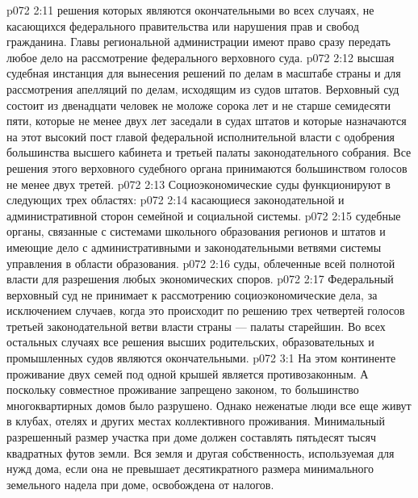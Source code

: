 \vs p072 2:11 \bibnobreakspace {} решения которых являются окончательными во всех случаях, не касающихся федерального правительства или нарушения прав и свобод гражданина. Главы региональной администрации имеют право сразу передать любое дело на рассмотрение федерального верховного суда.
\vs p072 2:12 \bibnobreakspace {} высшая судебная инстанция для вынесения решений по делам в масштабе страны и для рассмотрения апелляций по делам, исходящим из судов штатов. Верховный суд состоит из двенадцати человек не моложе сорока лет и не старше семидесяти пяти, которые не менее двух лет заседали в судах штатов и которые назначаются на этот высокий пост главой федеральной исполнительной власти с одобрения большинства высшего кабинета и третьей палаты законодательного собрания. Все решения этого верховного судебного органа принимаются большинством голосов не менее двух третей.
\vs p072 2:13 \pc Социоэкономические суды функционируют в следующих трех областях:
\vs p072 2:14 \bibnobreakspace {} касающиеся законодательной и административной сторон семейной и социальной системы.
\vs p072 2:15 \bibnobreakspace {} судебные органы, связанные с системами школьного образования регионов и штатов и имеющие дело с административными и законодательными ветвями системы управления в области образования.
\vs p072 2:16 \bibnobreakspace {} суды, облеченные всей полнотой власти для разрешения любых экономических споров.
\vs p072 2:17 \pc Федеральный верховный суд не принимает к рассмотрению социоэкономические дела, за исключением случаев, когда это происходит по решению трех четвертей голосов третьей законодательной ветви власти страны --- палаты старейшин. Во всех остальных случаях все решения высших родительских, образовательных и промышленных судов являются окончательными.
\vs p072 3:1 На этом континенте проживание двух семей под одной крышей является противозаконным. А поскольку совместное проживание запрещено законом, то большинство многоквартирных домов было разрушено. Однако неженатые люди все еще живут в клубах, отелях и других местах коллективного проживания. Минимальный разрешенный размер участка при доме должен составлять пятьдесят тысяч квадратных футов земли. Вся земля и другая собственность, используемая для нужд дома, если она не превышает десятикратного размера минимального земельного надела при доме, освобождена от налогов.
